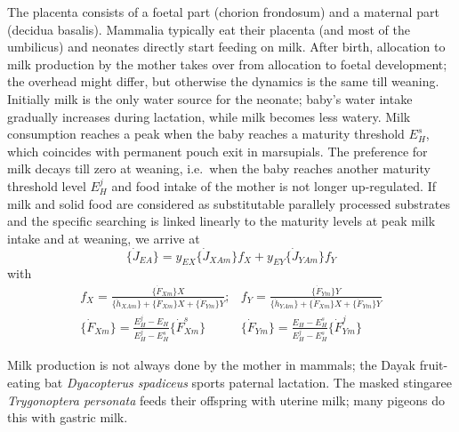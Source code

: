 The placenta consists of a foetal part (chorion frondosum) and a maternal part (decidua basalis).
Mammalia typically eat their placenta (and most of the umbilicus) and neonates directly start feeding on milk.
After birth, allocation to milk production by the mother takes over from allocation to foetal development; 
the overhead might differ, but otherwise the dynamics is the same till weaning.
Initially milk is the only water source for the neonate; 
baby's water intake gradually increases during lactation, while milk becomes less watery.
Milk consumption reaches a peak when the baby reaches a maturity threshold $E_H^s$, which coincides with permanent pouch exit in marsupials.
The preference for milk decays till zero at weaning, i.e.\ when the baby reaches another maturity threshold level $E_H^j$ and food intake of the mother is not longer up-regulated.
If milk and solid food are considered as substitutable parallely processed substrates and the specific searching is linked linearly to the maturity levels at peak milk intake and at weaning, we arrive at
\[
  \{\dot{J}_{EA}\} = y_{EX} \{\dot{J}_{XAm}\} f_X + y_{EY} \{\dot{J}_{YAm}\} f_Y
\] 
with 
\[
  \begin{array}{ll}
    f_X = \frac{\{\dot{F}_{Xm}\} X} {\{\dot{h}_{XAm}\} + \{\dot{F}_{Xm}\} X + \{\dot{F}_{Ym}\} Y};
    &
    f_Y = \frac{\{\dot{F}_{Ym}\} Y} {\{\dot{h}_{YAm}\} + \{\dot{F}_{Xm}\} X + \{\dot{F}_{Ym}\} Y}
    \\
    \{\dot{F}_{Xm}\} = \frac{E_H^j - E_H} {E_H^j - E_H^s} \{\dot{F}_{Xm}^s\}
    &
    \{\dot{F}_{Ym}\} = \frac{E_H - E_H^s} {E_H^j - E_H^s} \{\dot{F}_{Ym}^j\}
  \end{array}
\]
  
Milk production is not always done by the mother in mammals;
the Dayak fruit-eating bat \emph{Dyacopterus spadiceus} sports paternal lactation.
The masked stingaree  \emph{Trygonoptera personata} feeds their offspring with uterine milk; many pigeons do this with gastric milk.

